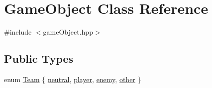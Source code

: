 \hypertarget{class_game_object}{\section{Game\-Object Class Reference}
\label{class_game_object}
}


{\ttfamily \#include $<$game\-Object.\-hpp$>$}

\subsection*{Public Types}
\begin{DoxyCompactItemize}
\item 
enum \hyperlink{class_game_object_a74fa2cc06824179e7e66ec56c2e31aad}{Team} \{ \hyperlink{class_game_object_a74fa2cc06824179e7e66ec56c2e31aada6315050694396f5d0fb89a979b63aaa7}{neutral}, 
\hyperlink{class_game_object_a74fa2cc06824179e7e66ec56c2e31aada8e7976f6369d71467ac8a3964858de45}{player}, 
\hyperlink{class_game_object_a74fa2cc06824179e7e66ec56c2e31aada46907cb94e92f180c619b0220679d5cb}{enemy}, 
\hyperlink{class_game_object_a74fa2cc06824179e7e66ec56c2e31aadaa15a756a1b9973ba34e3151e9d5d86f4}{other}
 \}
\end{DoxyCompactItemize}

